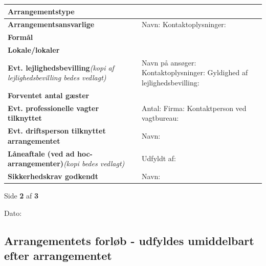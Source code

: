 \documentclass[a4paper, 11pt]{article}
\newcommand{\loglabel}[2][0.5cm]{\textbf{#2}\vspace{#1}}
\newcommand{\loglabelextended}[3][0.5cm]{\textbf{#2}\newline \textit{#3}\vspace{#1}}
\begin{document}
{{{{{{{{{{{{\begin{tabularx}{\textwidth}{|X|X|}
    \hline
    \loglabel{Arrangementstype} &  \\ \hline
    \loglabel{Arrangementsansvarlige} &
        Navn:  \newline
        Kontaktoplysninger:  \\ \hline
    \loglabel{Formål} &  \\ \hline
    \loglabel{Lokale/lokaler} &  \\ \hline
    \loglabelextended{Evt. lejlighedsbevilling}{(kopi af lejlighedsbevilling bedes vedlagt)} &
        Navn på ansøger: \newline
        Kontaktoplysninger: \vspace{0.5cm} \noindent \newline
        Gyldighed af lejlighedsbevilling: \vspace{1cm} \\ \hline
    \loglabel{Forventet antal gæster} &  \\ \hline
    \loglabel{Evt. professionelle vagter tilknyttet} &
        Antal: \newline
        Firma: \newline
        Kontaktperson ved vagtbureau: \\ \hline
    \loglabel[1cm]{Evt. driftsperson tilknyttet arrangementet} &
        Navn: \\ \hline
    \loglabelextended[1cm]{Låneaftale (ved ad hoc-arrangementer)}{(kopi bedes vedlagt)} &
        Udfyldt af:  \\ \hline
    \loglabel[1cm]{Sikkerhedskrav godkendt} &
        Navn: \\ \hline
\end{tabularx}

\vfill

\begin{center}
    Side \textbf{2} af \textbf{3}
\end{center}

\newpage

\noindent
\small{Dato: \textbf{ } }

\subsection*{Arrangementets forløb - udfyldes umiddelbart efter arrangementet}

}}}}}}}}}}}}
\end{document}
